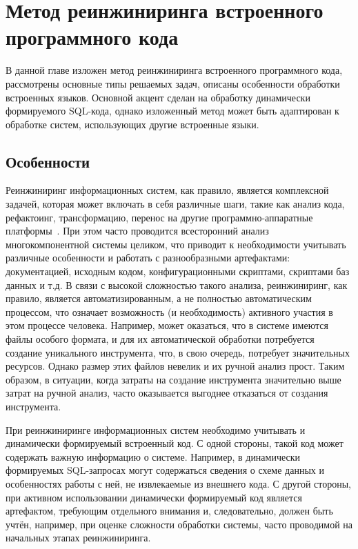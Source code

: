 \chapter{Метод реинжиниринга встроенного программного кода}

В данной главе изложен метод реинжиниринга встроенного программного кода, рассмотрены основные типы решаемых задач, описаны особенности обработки встроенных языков. Основной акцент сделан на обработку динамически формируемого SQL-кода, однако изложенный метод может быть адаптирован к обработке систем, использующих другие встроенные языки.

\section{Особенности}

Реинжиниринг информационных систем, как правило, является комплексной задачей, которая может включать в себя различные шаги, такие как анализ кода, рефактоинг, трансформацию, перенос на другие программно-аппаратные платформы~\cite{reengANT}. При этом часто проводится всесторонний анализ многокомпонентной системы целиком, что приводит к необходимости учитывать различные особенности и работать с разнообразными артефактами: документацией, исходным кодом, конфигурационными скриптами, скриптами баз данных и т.д. В связи с высокой сложностью такого анализа, реинжиниринг, как правило, является автоматизированным, а не полностью автоматическим процессом, что означает возможность (и необходимость) активного участия в этом процессе человека.  Например, может оказаться, что в системе имеются файлы особого формата, и для их автоматической обработки потребуется создание уникального инструмента, что, в свою очередь, потребует значительных ресурсов. Однако размер этих файлов невелик и их ручной анализ прост. Таким образом, в ситуации, когда затраты на создание инструмента значительно выше затрат на ручной анализ, часто оказывается выгоднее отказаться от создания инструмента.

При реинжиниринге информационных систем необходимо учитывать и динамически формируемый встроенный код. С одной стороны, такой код может содержать важную информацию о системе. Например, в динамически формируемых SQL-запросах могут содержаться сведения о схеме данных и особенностях работы с ней, не извлекаемые из внешнего кода. С другой стороны, при активном использовании динамически формируемый код является артефактом, требующим отдельного внимания и, следовательно, должен быть учтён, например, при оценке сложности обработки системы, часто проводимой на начальных этапах реинжиниринга.

